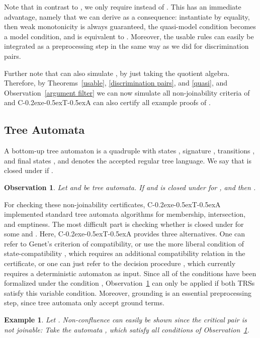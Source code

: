 \documentclass[a4paper]{easychair}
\newtheorem{observation}[theorem]{Observation}
\newtheorem{example}[theorem]{Example}
\newcommand\ceta{\textsf{C\kern-0.2exe\kern-0.5exT\kern-0.5exA}\xspace}
\newcommand\rObs[1]{Observation~\ref{#1}}
\begin{document}
Note that in contrast to \cite[Theorem 10]{Aoto}, we only require 
instead of .
This has an immediate advantage, namely that we can derive \cite[Corollary 6]{Aoto} as a consequence:
instantiate  by equality, then weak monotonicity is always guaranteed, the quasi-model condition
becomes a model condition, and  is equivalent to
. Moreover, the usable rules can easily be integrated as a preprocessing
step in the same way as we did for discrimination pairs.

Further note that \cite[Corollary 6]{Aoto} can also simulate \cite[Theorem 5]{Aoto}, by just
taking the quotient algebra. Therefore, by Theorems~\ref{usable}, \ref{discrimination pairs}, and 
\ref{quasi}, and \rObs{argument filter}
we can now simulate all non-joinability criteria of \cite{Aoto} and \ceta can also certify all 
example proofs of \cite{Aoto}.

\subsection{Tree Automata}

A bottom-up tree automaton  is a quadruple  
with states , signature ,
transitions , and final states , and  
denotes the accepted regular tree language. We say that  is closed under  if
.

\begin{observation}
\label{automata}
Let  and  be tree automata.
If  and  is closed under  for , and
 then .
\end{observation}

For checking these non-joinability certificates, \ceta implemented standard tree automata algorithms
for membership, intersection, and emptiness. The most difficult part is checking whether
 is closed under  for some  and .
Here, \ceta provides three alternatives. One can refer to Genet's criterion 
of compatibility, or use the more liberal condition of state-compatibility \cite{BFRT-LATA14}, which 
requires an additional compatibility relation in the certificate, or one can just refer to
the decision procedure \cite{BFRT-LATA14}, which currently requires a deterministic automaton as input.
Since all of the conditions have been formalized under the condition , 
\rObs{automata} can only be applied if both TRSs satisfy this variable condition.
Moreover, grounding is an essential preprocessing step, since tree automata only accept ground
terms.

\begin{example}
\label{aut ex}
Let .
Non-confluence can easily be shown since the critical pair  is not joinable:
Take the automata , which
satisfy all conditions of \rObs{automata}. 
\end{example}
\end{document}
